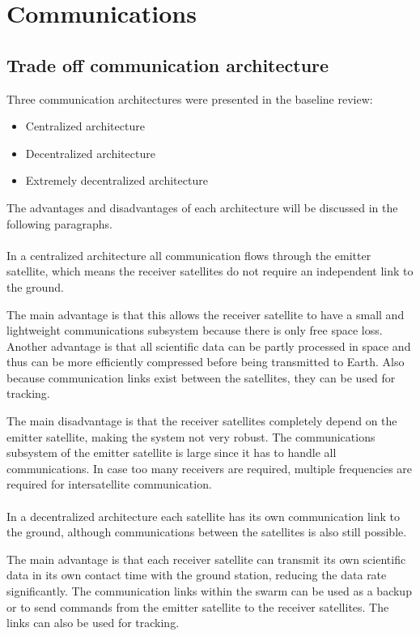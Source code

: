 \section{Communications}
\label{mtrTOCOM}

\subsection{Trade off communication architecture}
Three communication architectures were presented in the baseline review:
\begin{itemize}
\item Centralized architecture
\item Decentralized architecture
\item Extremely decentralized architecture
\end{itemize}
The advantages and disadvantages of each architecture will be discussed in the following paragraphs.\\\\
In a centralized architecture all communication flows through the emitter satellite, which means the receiver satellites do not require an independent link to the ground.

The main advantage is that this allows the receiver satellite to have a small and lightweight communications subsystem because there is only free space loss. Another advantage is that all scientific data can be partly processed in space and thus can be more efficiently compressed before being transmitted to Earth. Also because communication links exist between the satellites, they can be used for tracking.

The main disadvantage is that the receiver satellites completely depend on the emitter satellite, making the system not very robust. The communications subsystem of the emitter satellite is large since it has to handle all communications. In case too many receivers are required, multiple frequencies are required for intersatellite communication.\\\\
In a decentralized architecture each satellite has its own communication link to the ground, although communications between the satellites is also still possible.

The main advantage is that each receiver satellite can transmit its own scientific data in its own contact time with the ground station, reducing the data rate significantly. The communication links within the swarm can be used as a backup or to send commands from the emitter satellite to the receiver satellites. The links can also be used for tracking.

